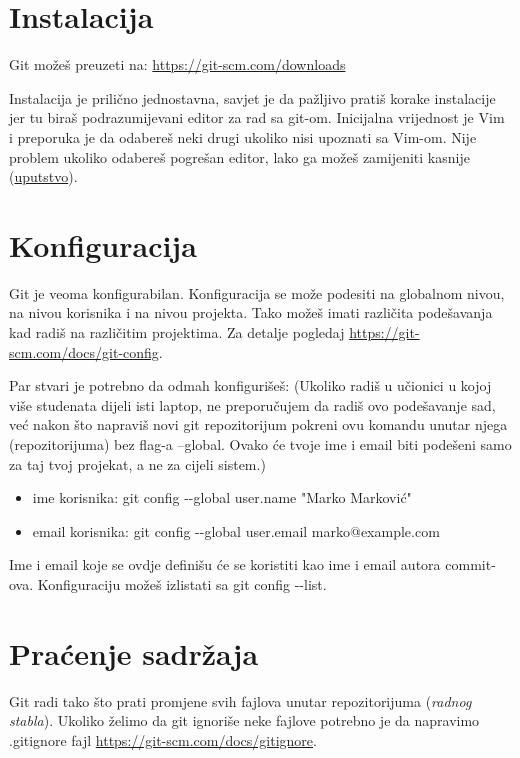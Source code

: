 \documentclass[11pt,a4paper]{article}
\begin{document}
\section{Instalacija}

Git možeš preuzeti na: \url{https://git-scm.com/downloads}

Instalacija je prilično jednostavna, savjet je da pažljivo pratiš korake
instalacije jer tu biraš podrazumijevani editor za rad sa git-om.
Inicijalna vrijednost je Vim i preporuka je da odabereš neki drugi
ukoliko nisi upoznati sa Vim-om. Nije problem ukoliko odabereš pogrešan
editor, lako ga možeš zamijeniti kasnije
(\href{https://stackoverflow.com/questions/2596805/how-do-i-make-git-use-the-editor-of-my-choice-for-commits}{uputstvo}).

\section{Konfiguracija}

Git je veoma konfigurabilan. Konfiguracija se može podesiti na globalnom
nivou, na nivou korisnika i na nivou projekta. Tako možeš imati
različita podešavanja kad radiš na različitim projektima. Za detalje
pogledaj \url{https://git-scm.com/docs/git-config}.

Par stvari je potrebno da odmah konfigurišeš: (Ukoliko radiš u učionici
u kojoj više studenata dijeli isti laptop, ne preporučujem da radiš ovo
podešavanje sad, već nakon što napraviš novi git repozitorijum pokreni
ovu komandu unutar njega (repozitorijuma) bez flag-a --global. Ovako će
tvoje ime i email biti podešeni samo za taj tvoj projekat, a ne za
cijeli sistem.)

\begin{itemize}
\item
  ime korisnika: git config -\/-global user.name "Marko Marković"
\item
  email korisnika: git config -\/-global user.email marko@example.com
\end{itemize}

Ime i email koje se ovdje definišu će se koristiti kao ime i email
autora commit-ova. Konfiguraciju možeš izlistati sa git config -\/-list.

\section{Praćenje sadržaja}

Git radi tako što prati promjene svih fajlova unutar repozitorijuma
(\emph{radnog stabla}). Ukoliko želimo da git ignoriše neke fajlove
potrebno je da napravimo .gitignore fajl
\url{https://git-scm.com/docs/gitignore}.
\end{document}
